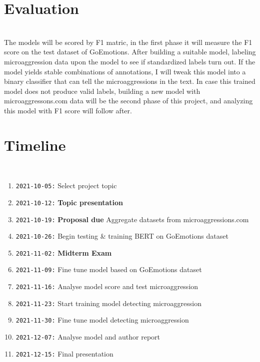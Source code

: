 \documentclass[12pt]{main}
\begin{document}
\section*{Evaluation}
\\
The models will be scored by F1 matric, in the first phase it will measure the F1 score
on the test dataset of GoEmotions. After building a suitable model,
labeling microaggression data upon the model to see if standardized labels turn out.
If the model yields stable combinations of annotations, I will tweak this model into a binary classifier
that can tell the microaggressions in the text.
In case this trained model does not produce valid labels,
building a new model with microaggressons.com data will be the second phase of this project,
and analyzing this model with F1 score will follow after.


\section*{Timeline}
\\
\begin{enumerate}[label={}]
	\item \hspace{-10mm}\texttt{2021-10-05:} Select project topic
	\item \hspace{-10mm}\texttt{2021-10-12:} \textbf{Topic presentation}
	\item \hspace{-10mm}\texttt{2021-10-19:} \textbf{Proposal due} Aggregate datasets from microaggressions.com
	\item \hspace{-10mm}\texttt{2021-10-26:} Begin testing \& training BERT on GoEmotions dataset
	\item \hspace{-10mm}\texttt{2021-11-02:} \textbf{Midterm Exam}
	\item \hspace{-10mm}\texttt{2021-11-09:} Fine tune model based on GoEmotions dataset
	\item \hspace{-10mm}\texttt{2021-11-16:} Analyse model score and test microaggression
	\item \hspace{-10mm}\texttt{2021-11-23:} Start training model detecting microaggression
	\item \hspace{-10mm}\texttt{2021-11-30:} Fine tune model detecting microaggression
	\item \hspace{-10mm}\texttt{2021-12-07:} Analyse model and author report
	\item \hspace{-10mm}\texttt{2021-12-15:} Final presentation
\end{enumerate}




\end{document}
